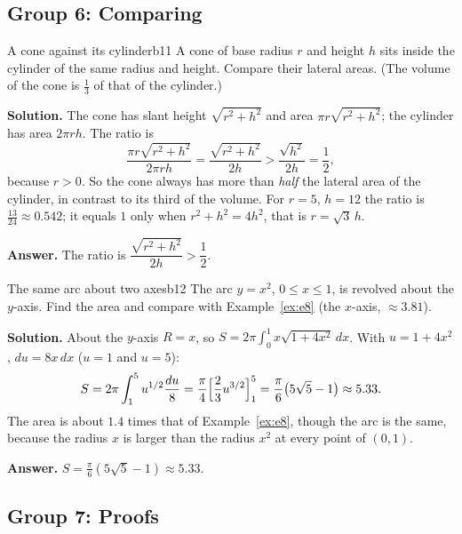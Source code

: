 \documentclass[11pt]{article}
\begin{document}
\subsection*{Group 6: Comparing}

\begin{exmp}{A cone against its cylinder}{b11}
A cone of base radius $r$ and height $h$ sits inside the cylinder of the same radius and height. Compare their lateral areas. (The volume of the cone is $\frac13$ of that of the cylinder.)

\textbf{Solution.} The cone has slant height $\sqrt{r^2+h^2}$ and area $\pi r\sqrt{r^2+h^2}$; the cylinder has area $2\pi rh$. The ratio is
\[
\frac{\pi r\sqrt{r^2+h^2}}{2\pi rh}=\frac{\sqrt{r^2+h^2}}{2h}>\frac{\sqrt{h^2}}{2h}=\frac12,
\]
because $r>0$. So the cone always has more than \emph{half} the lateral area of the cylinder, in contrast to its third of the volume. For $r=5$, $h=12$ the ratio is $\frac{13}{24}\approx0.542$; it equals $1$ only when $r^2+h^2=4h^2$, that is $r=\sqrt3\,h$.

\textbf{Answer.} The ratio is $\dfrac{\sqrt{r^2+h^2}}{2h}>\dfrac12$.
\end{exmp}

\begin{exmp}{The same arc about two axes}{b12}
The arc $y=x^2$, $0\le x\le1$, is revolved about the $y$-axis. Find the area and compare with Example~\ref{ex:e8} (the $x$-axis, $\approx3.81$).

\textbf{Solution.} About the $y$-axis $R=x$, so $S=2\pi\int_0^1x\sqrt{1+4x^2}\,dx$. With $u=1+4x^2$, $du=8x\,dx$ ($u=1$ and $u=5$):
\[
S=2\pi\int_1^5u^{1/2}\frac{du}8=\frac\pi4\Bigl[\frac23u^{3/2}\Bigr]_1^5=\frac\pi6\bigl(5\sqrt5-1\bigr)\approx5.33 .
\]
The area is about $1.4$ times that of Example~\ref{ex:e8}, though the arc is the same, because the radius $x$ is larger than the radius $x^2$ at every point of $(0,1)$.

\textbf{Answer.} $S=\frac\pi6(5\sqrt5-1)\approx5.33$.
\end{exmp}

\subsection*{Group 7: Proofs}
\end{document}
